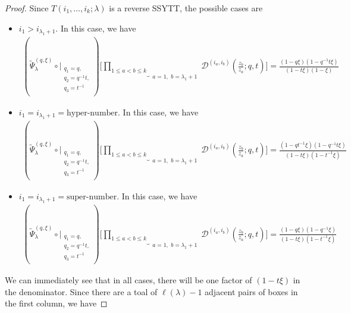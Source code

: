 \documentclass[12pt,reqno,a4paper]{amsart}
\newcommand{\comp}{\circ}
\newcommand{\cals}[1]{\mathcal{#1}}
\numberwithin{equation}{section}
\newcommand{\dualmap}{
\widetilde{\Psi}^{(q,\xi)}_{\lambda}
}
\theoremstyle{definition}
\begin{document}
\begin{proof}
Since $T(i_1,\dots,i_k;\lambda)$ is a reverse SSYTT, the possible cases are 
\begin{itemize}
	\item $i_1 > i_{\lambda_1 + 1}$. In this case, we have 
	\footnotesize
	\begin{align}
		(
		\dualmap
		\comp 
		\bigg|_{
			\substack{
				q_1 = q, \\
				q_2 = q^{-1}t,\\
				q_3 = t^{-1} \\
			}
		}
		)
		\Bigg[
		\underbrace{		\prod_{1 \leq a < b \leq k}					}_{
			\substack{
				a = 1, \,\, b = \lambda_1 + 1
			}
		}
		\cals{D}^{(i_a,i_b)}\left(
		\frac{z_b}{z_a}
		; q, t
		\right)
		\Bigg]
		=
		\frac{
			(1 - q\xi)(1 - q^{-1}t\xi)
		}{
			(1 - t\xi)(1 - \xi)
		}
	\end{align}
	\normalsize
	\item $i_1 = i_{\lambda_1 + 1} = \text{hyper-number}$. In this case, we have 
	\footnotesize
	\begin{align}
		(
		\dualmap
		\comp 
		\bigg|_{
			\substack{
				q_1 = q, \\
				q_2 = q^{-1}t,\\
				q_3 = t^{-1} \\
			}
		}
		)
		\Bigg[
		\underbrace{		\prod_{1 \leq a < b \leq k}					}_{
			\substack{
				a = 1, \,\, b = \lambda_1 + 1
			}
		}
		\cals{D}^{(i_a,i_b)}\left(
		\frac{z_b}{z_a}
		; q, t
		\right)
		\Bigg]
		= 
		\frac{
			(1 - qt^{-1}\xi)
			(1 - q^{-1}t\xi)
		}{
			(1 - t\xi)
			(1 - t^{-1}\xi)
		}
	\end{align}
	\normalsize
	\item $i_1 = i_{\lambda_1 + 1} = \text{super-number}$. In this case, we have 
	\footnotesize
	\begin{align}
		(
		\dualmap
		\comp 
		\bigg|_{
			\substack{
				q_1 = q, \\
				q_2 = q^{-1}t,\\
				q_3 = t^{-1} \\
			}
		}
		)
		\Bigg[
		\underbrace{		\prod_{1 \leq a < b \leq k}					}_{
			\substack{
				a = 1, \,\, b = \lambda_1 + 1
			}
		}
		\cals{D}^{(i_a,i_b)}\left(
		\frac{z_b}{z_a}
		; q, t
		\right)
		\Bigg]
		= 
		\frac{
			(1 - q\xi)
			(1 - q^{-1}\xi)
		}{
			(1 - t\xi)
			(1 - t^{-1}\xi)
		}
	\end{align}
	\normalsize
\end{itemize}
We can immediately see that in all cases, there will be one factor of $(1 - t\xi)$ in the denominator. Since there are a toal of $\ell(\lambda) - 1$ adjacent pairs of boxes in the first column, we have 

\end{proof}
\end{document}
